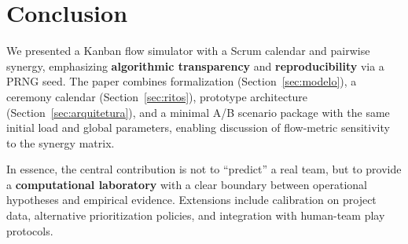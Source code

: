 \section{Conclusion}
\label{sec:conclusao}

We presented a Kanban flow simulator with a Scrum calendar and pairwise synergy, emphasizing \textbf{algorithmic transparency} and \textbf{reproducibility} via a PRNG seed. The paper combines formalization (Section~\ref{sec:modelo}), a ceremony calendar (Section~\ref{sec:ritos}), prototype architecture (Section~\ref{sec:arquitetura}), and a minimal A/B scenario package with the same initial load and global parameters, enabling discussion of flow-metric sensitivity to the synergy matrix.

In essence, the central contribution is not to ``predict'' a real team, but to provide a \textbf{computational laboratory} with a clear boundary between operational hypotheses and empirical evidence. Extensions include calibration on project data, alternative prioritization policies, and integration with human-team play protocols.
